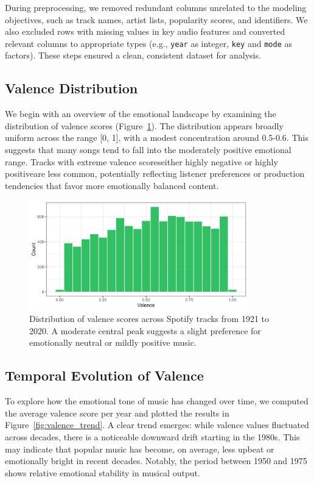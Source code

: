 \documentclass[a4paper,11pt]{article}
\begin{document}
During preprocessing, we removed redundant columns unrelated to the modeling objectives, such as track names, artist lists, popularity scores, and identifiers. We also excluded rows with missing values in key audio features and converted relevant columns to appropriate types (e.g., \texttt{year} as integer, \texttt{key} and \texttt{mode} as factors). These steps ensured a clean, consistent dataset for analysis.

\subsection{Valence Distribution}
We begin with an overview of the emotional landscape by examining the distribution of valence scores (Figure~\ref{fig:valence_distribution}). The distribution appears broadly uniform across the range [0, 1], with a modest concentration around 0.5-0.6. This suggests that many songs tend to fall into the moderately positive emotional range. Tracks with extreme valence scores\textemdash either highly negative or highly positive\textemdash are less common, potentially reflecting listener preferences or production tendencies that favor more emotionally balanced content.

\begin{figure}[h]
\centering
\includegraphics[width=0.85\textwidth]{Figure1-valence-distribution.png}
\caption{Distribution of valence scores across Spotify tracks from 1921 to 2020. A moderate central peak suggests a slight preference for emotionally neutral or mildly positive music.}
\label{fig:valence_distribution}
\end{figure}

\subsection{Temporal Evolution of Valence}
To explore how the emotional tone of music has changed over time, we computed the average valence score per year and plotted the results in Figure~\ref{fig:valence_trend}. A clear trend emerges: while valence values fluctuated across decades, there is a noticeable downward drift starting in the 1980s. This may indicate that popular music has become, on average, less upbeat or emotionally bright in recent decades. Notably, the period between 1950 and 1975 shows relative emotional stability in musical output.
\end{document}
